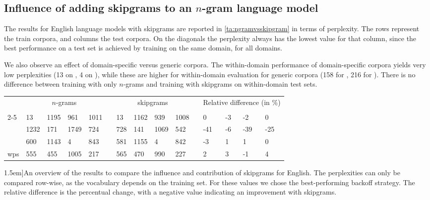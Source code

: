 \subsection{Influence of adding skipgrams to an $n$-gram language model}
The results for English language models with skipgrams are reported in \cref{ta:ngramvsskipgram} in terms of perplexity. The rows represent the train corpora, and columns the test corpora. On the diagonals the perplexity always has the lowest value for that column, since the best performance on a test set is achieved by training on the same domain, for all domains. 

We also observe an effect of domain-specific versus generic corpora. The within-domain performance of domain-specific corpora yields very low perplexities (13 on \jrc, 4 on \emea), while these are higher for within-domain evaluation for generic corpora (158 for \obw, 216 for \wp). There is no difference between training with only $n$-grams and training with skipgrams on within-domain test sets.

     \begin{table*}
	\begin{tabular}{lllllllllllllll}
		& \multicolumn{4}{c}{$n$-grams}	& & \multicolumn{4}{c}{skipgrams}&& \multicolumn{4}{c}{Relative difference (in \%)}\\
		& \jrc	& \obw	& \emea	& \wp	& & \jrc	& \obw	& \emea	& \wp	& & \jrc	& \obw	& \emea	& \wp \\ \cline{2-5}\cline{7-10} \cline{12-15}
		\jrc		& 13	& 1195	& 961	& 1011	& & 13	& 1162	& 939	& 1008	& & 0	& -3	& -2	& 0		\\
		\obw	& 1232	& 171	& 1749	& 724	& & 728	& 141	& 1069	& 542	& & -41	& -6	& -39	& -25	\\
		\emea	& 600	& 1143	& 4		& 843	& & 581	& 1155	& 4		& 842	& & -3	& 1	& 1		& 0		\\
		wps		& 555	& 455	& 1005	& 217	& & 565	& 470	& 990	& 227	& & 2	& 3	& -1	& 4
	\end{tabular} 
	\caption[][1.5em]{An overview of the results to compare the influence and contribution of skipgrams for English. 
		The perplexities can only be compared row-wise, as the vocabulary depends on the training set. For these values we chose the best-performing backoff strategy. The relative difference is the percentual change, with a negative value indicating an improvement with skipgrams.}\label{ta:ngramvsskipgram}
\end{table*} 

